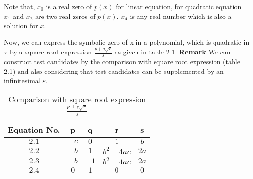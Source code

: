 Note that, $x_{0}$ is a real zero of $p(x)$ for linear equation, for quadratic equation $x_{1}$ and $x_{2}$ are two real zeros of $p(x)$. $x_{4}$ is any real number which is also a solution for $x$.


Now, we can express the symbolic zero of x in a polynomial, which is quadratic in x by a square root expression $\frac{p+q\sqrt{r}}{s}$ as given in table 2.1.\newline
\textbf{Remark} We can construct test candidates by the comparison with square root expression (table 2.1) and also considering that test candidates can be supplemented by an infinitesimal $\varepsilon$.

\begin{table}[htb]
	\caption{Comparison with square root expression $\frac{p+q\sqrt{r}}{s}$}
	\label{tab:nameOfTheTable}
	\bigskip %
	\begin{center}
		\begin{tabular}{|c|c|c|c|c|}
			\hline
			Equation No.& p & q & r & s \\
			\hline
			$2.1$ & $-c$ & $0$ & $1$ & $b$ \\
			\hline
			$2.2$ & $-b$ & $1$ & $b^{2}-4ac$ & $2a$ \\
			\hline
			$2.3$ & $-b$ & $-1$ & $b^{2}-4ac$ & $2a$ \\
			\hline
			$2.4$ & $0$ & $1$ & $0$ & $0$ \\
			\hline
		\end{tabular}
	\end{center}
\end{table}


